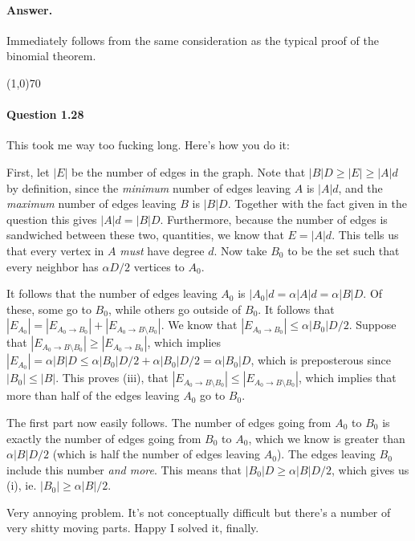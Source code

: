\paragraph{Answer.} Immediately follows from the same consideration as the typical proof of the binomial theorem.

\begin{center}
	\line(1,0){70}
\end{center}

\paragraph{Question 1.28} This took me way too fucking long. Here's how you do it:

First, let $|E|$ be the number of edges in the graph. Note that $|B|D\geq|E|\geq|A|d$ by definition, since the \textit{minimum} number of edges leaving $A$ is $|A|d$, and the \textit{maximum} number of edges leaving $B$ is $|B|D$. Together with the fact given in the question this gives $|A|d=|B|D$. Furthermore, because the number of edges is sandwiched between these two, quantities, we know that $E=|A|d$. This tells us that every vertex in $A$ \textit{must} have degree $d$. Now take $B_0$ to be the set such that every neighbor has $\alpha D/2$ vertices to $A_0$.

It follows that the number of edges leaving $A_0$ is $|A_0|d = \alpha|A|d = \alpha|B|D$. Of these, some go to $B_0$, while others go outside of $B_0$. It follows that $|E_{A_0}|=|E_{A_0\rightarrow B_0}|+|E_{A_0\rightarrow B\setminus B_0}|$. We know that $|E_{A_0\rightarrow B_0}|\leq \alpha|B_0|D/2$. Suppose that $|E_{A_0\rightarrow B\setminus B_0}|\geq|E_{A_0\rightarrow B_0}|$, which implies $|E_{A_0}|=\alpha|B|D\leq \alpha|B_0|D/2+\alpha|B_0|D/2=\alpha|B_0|D$, which is preposterous since $|B_0|\leq |B|$. This proves (iii), that $|E_{A_0\rightarrow B\setminus B_0}|\leq |E_{A_0\rightarrow B\setminus B_0}|$, which implies that more than half of the edges leaving $A_0$ go to $B_0$.

The first part now easily follows. The number of edges going from $A_0$ to $B_0$ is exactly the number of edges going from $B_0$ to $A_0$, which we know is greater than $\alpha|B|D/2$ (which is half the number of edges leaving $A_0$). The edges leaving $B_0$ include this number \textit{and more}. This means that $|B_0|D\geq \alpha|B|D/2$, which gives us (i), ie. $|B_0|\geq\alpha|B|/2$.

Very annoying problem. It's not conceptually difficult but there's a number of very shitty moving parts. Happy I solved it, finally.

